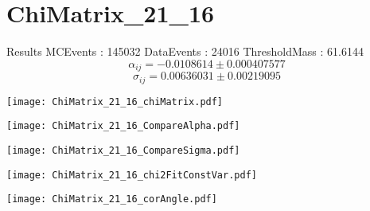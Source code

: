 \documentclass[a4paper,12pt]{article}
\begin{document}
\section{ChiMatrix\_21\_16}
\begin{minipage}{0.49\linewidth} Results \newline
MCEvents : 145032\newline
DataEvents : 24016 \newline
ThresholdMass : 61.6144\\
$$\alpha_{ij} = -0.0108614\pm 0.000407577$$
$$\sigma_{ij} = 0.00636031\pm 0.00219095$$
\end{minipage}\hfill
\begin{minipage}{0.49\linewidth} 
\texttt{[image: ChiMatrix\_21\_16\_chiMatrix.pdf]}\\
\end{minipage}
\hfill
\begin{minipage}{0.49\linewidth} 
\texttt{[image: ChiMatrix\_21\_16\_CompareAlpha.pdf]}\\
\end{minipage}
\hfill
\begin{minipage}{0.49\linewidth} 
\texttt{[image: ChiMatrix\_21\_16\_CompareSigma.pdf]}\\
\end{minipage}
\begin{minipage}{0.49\linewidth} 
\texttt{[image: ChiMatrix\_21\_16\_chi2FitConstVar.pdf]}\\
\end{minipage}
\hfill
\begin{minipage}{0.49\linewidth} 
\texttt{[image: ChiMatrix\_21\_16\_corAngle.pdf]}\\
\end{minipage}
\end{document}
